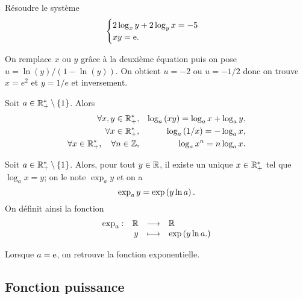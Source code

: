 \documentclass{magnolia}
\begin{document}
\begin{exoUnique}
\exo Résoudre le système
  \[\begin{cases}
    2\log_x y+2\log_y x=-5 &\\
    xy={\rm e}. &
    \end{cases}\]
  \begin{sol}
  On remplace $x$ ou $y$ grâce à la deuxième équation puis on pose $u=\ln(y)/(1-\ln(y))$. On obtient $u=-2$ ou $u=-1/2$ donc on trouve $x=e^2$ et $y=1/e$ et inversement.    
  \end{sol}
\end{exoUnique}

\begin{proposition}[utile=-3]
Soit $a\in\mathbb{R}_+^*\setminus\left\{1\right\}$. Alors
\begin{eqnarray*}
\forall x,y\in\mathbb{R}_+^*, & & \log_a \left(xy\right)=\log_a  x+\log_a  y,\\
\forall x\in\mathbb{R}_+^*, & & \log_a \left(1/x\right)=-\log_a  x,\\
\forall x\in\mathbb{R}_+^* ,\quad \forall n\in\mathbb{Z}, & & \log_a  x^n=n\log_a x.
\end{eqnarray*}
\end{proposition}

\begin{definition}[utile=-3]
Soit $a\in\mathbb{R}_+^*\setminus\left\{1\right\}$. Alors, pour tout $y\in\mathbb{R}$, il existe un unique
$x\in\mathbb{R}_+^*$ tel que $\log_a x=y$; on le note $\exp_a y$ et on a
\[\exp_a y=\exp\left(y\ln a\right).\]
On définit ainsi la fonction
\[\begin{array}[t]{lrcl} \displaystyle{\exp_a} : & \displaystyle{\mathbb{R}} & \longrightarrow & \displaystyle{\mathbb{R}} \\ & \displaystyle{y} & \longmapsto & \displaystyle{\exp\left(y \ln a .\right)} \end{array}\]
\end{definition}

\begin{remarqueUnique}
\remarque Lorsque $a={\rm e}$, on retrouve la fonction exponentielle.  
\end{remarqueUnique}


\subsection{Fonction puissance}
\end{document}
